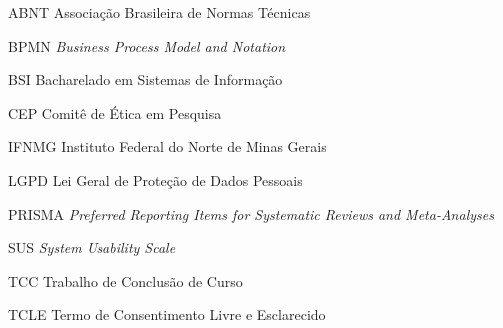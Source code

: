 
\begin{siglas}
  \item[ABNT] Associação Brasileira de Normas Técnicas
  \item[BPMN] \textit{Business Process Model and Notation}
  \item[BSI] Bacharelado em Sistemas de Informação
  \item[CEP] Comitê de Ética em Pesquisa
  \item[IFNMG] Instituto Federal do Norte de Minas Gerais
  \item[LGPD] Lei Geral de Proteção de Dados Pessoais
  \item[PRISMA] \textit{Preferred Reporting Items for Systematic Reviews and Meta-Analyses}
  \item[SUS] \textit{System Usability Scale}
  \item[TCC] Trabalho de Conclusão de Curso
  \item[TCLE] Termo de Consentimento Livre e Esclarecido
\end{siglas}
